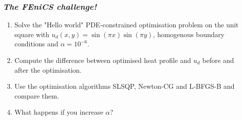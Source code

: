 \begin{frame}
  \frametitle{\emph{The FEniCS challenge!}}

  \begin{enumerate}
      \item Solve the "Hello world" PDE-constrained optimisation problem on the unit square with 
          $u_d(x, y) = \sin(\pi x)\sin(\pi y)$, homogenous boundary conditions and $\alpha=10^{-6}$.
      \item Compute the difference between optimised heat profile and $u_d$ before and after the optimisation.
      \item Use the optimisation algorithms SLSQP, Newton-CG and L-BFGS-B and compare them.
      \item What happens if you increase $\alpha$?
  \end{enumerate}

\end{frame}

